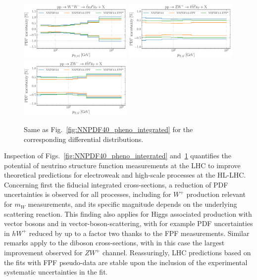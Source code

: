 \begin{figure}[htbp]
\includegraphics[width=0.49\textwidth]{plots/LHCpheno/NNPDF_WPWM_14TEV_40_PHENO-global.pdf}
\includegraphics[width=0.49\textwidth]{plots/LHCpheno/NNPDF_WPZ_14TEV_40_PHENO-global.pdf}
\includegraphics[width=0.49\textwidth]{plots/LHCpheno/NNPDF_WMZ_14TEV_40_PHENO-global.pdf}
\caption{Same as Fig.~\ref{fig:NNPDF40_pheno_integrated}
for the corresponding differential distributions.
%
}
\label{fig:NNPDF40_pheno_differential}
\end{figure}

Inspection of Figs.~\ref{fig:NNPDF40_pheno_integrated} and~\ref{fig:NNPDF40_pheno_differential}
quantifies the potential of neutrino structure function measurements at the LHC
to improve theoretical predictions for electroweak and high-scale processes at the HL-LHC.
%
Concerning first the fiducial integrated cross-sections, a reduction of PDF
uncertainties is observed for all processes,
including for $W^+$ production relevant for $m_W$ measurements, and its specific  magnitude depends
on the underlying scattering reaction.
%
This finding also applies for Higgs associated production with vector bosons and in vector-boson-scattering,
with for example
PDF uncertainties in $hW^+$ reduced by up to a factor two thanks to the FPF measurements.
%
Similar remarks apply to the diboson cross-sections, with in this case the largest
improvement observed for $ZW^+$ channel.
%
Reassuringly, LHC predictions based on the fits with FPF pseudo-data are stable
upon the inclusion of the experimental systematic uncertainties in the fit.

